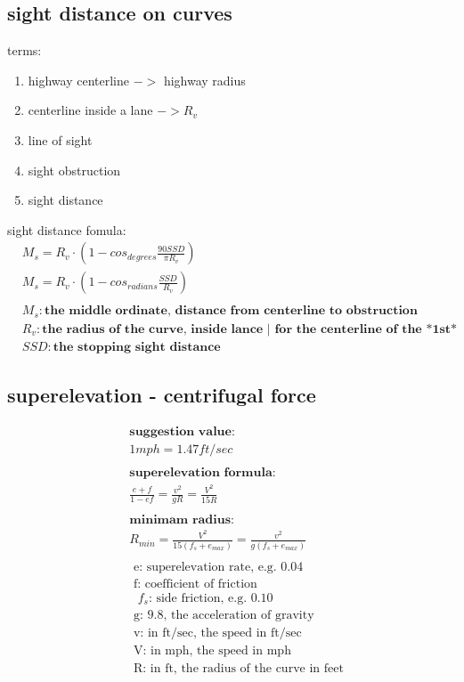 \documentclass{article}
\begin{document}
  \subsection{sight distance on curves}
  terms:
  \begin{enumerate}
    \item highway centerline $->$ highway radius 
    \item centerline inside a lane $-> R_v $
    \item line of sight
    \item sight obstruction
    \item sight distance
  \end{enumerate}
    sight distance fomula:
  \begin{align*}
    & M_s = R_v \cdot (1 - cos_{degrees} \frac{90 SSD}{\pi R_v}) \\
    & M_s = R_v \cdot (1 - cos_{radians} \frac{SSD}{R_v}) \\
    \\
    & M_s: \textbf{the middle ordinate, distance from centerline to obstruction} \\
    & R_v: \textbf{the radius of the curve, inside lance | for the centerline of the *1st* lane}\\
    & SSD: \textbf{the stopping sight distance}
  \end{align*}

  \subsection{superelevation - centrifugal force}
  \begin{align*}
    & \textbf{suggestion value:} \\
    & 1 mph = 1.47 ft/sec \\
    \\
    & \textbf{superelevation formula:} \\
    & \frac{e + f}{1 - ef} = \frac{v^2}{gR} = \frac{V^2}{15R} \\
    \\
    & \textbf{minimam radius:} \\
    & R_{min} = \frac{V^2}{15(f_s + e_{max})} = \frac{v^2}{g(f_s + e_{max})} \\
    \\
    & \text{ e: superelevation rate, e.g. 0.04} \\
    & \text{ f: coefficient of friction} \\
    & \text{ $f_s$: side friction, e.g. 0.10} \\
    & \text{ g: 9.8, the acceleration of gravity} \\
    & \text{ v: in ft/sec, the speed in ft/sec} \\
    & \text{ V: in mph, the speed in mph} \\
    & \text{ R: in ft, the radius of the curve in feet} \\
  \end{align*}
\end{document}
